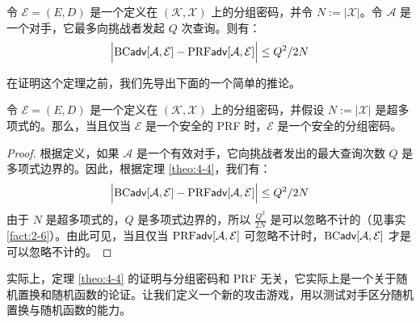 \begin{theorem}\label{theo:4-4}
令 $\mathcal{E}=(E,D)$ 是一个定义在 $(\mathcal{K},\mathcal{X})$ 上的分组密码，并令 $N:=|\mathcal{X}|$。令 $\mathcal{A}$ 是一个对手，它最多向挑战者发起 $Q$ 次查询。则有：
\[
\Big\lvert
{\rm BC\mathsf{adv}}[\mathcal{A},\mathcal{E}]-{\rm PRF\mathsf{adv}}[\mathcal{A},\mathcal{E}]
\Big\rvert
\leq{Q^2}/{2N}
\]
\end{theorem}

在证明这个定理之前，我们先导出下面的一个简单的推论。

\begin{corollary}\label{cor:4-5}
令 $\mathcal{E}=(E,D)$ 是一个定义在 $(\mathcal{K},\mathcal{X})$ 上的分组密码，并假设 $N:=|\mathcal{X}|$ 是超多项式的。那么，当且仅当 $\mathcal{E}$ 是一个安全的 PRF 时，$\mathcal{E}$ 是一个安全的分组密码。
\end{corollary}

\begin{proof}
根据定义，如果 $\mathcal{A}$ 是一个有效对手，它向挑战者发出的最大查询次数 $Q$ 是多项式边界的。因此，根据定理 \ref{theo:4-4}，我们有：
\[
\Big\lvert
{\rm BC\mathsf{adv}}[\mathcal{A},\mathcal{E}]-{\rm PRF\mathsf{adv}}[\mathcal{A},\mathcal{E}]
\Big\rvert
\leq{Q^2}/{2N}
\]
由于 $N$ 是超多项式的，$Q$ 是多项式边界的，所以 $\frac{Q^2}{2N}$ 是可以忽略不计的（见事实 \ref{fact:2-6}）。由此可见，当且仅当 ${\rm PRF\mathsf{adv}}[\mathcal{A},\mathcal{E}]$ 可忽略不计时，${\rm BC\mathsf{adv}}[\mathcal{A},\mathcal{E}]$ 才是可以忽略不计的。
\end{proof}

实际上，定理 \ref{theo:4-4} 的证明与分组密码和 PRF 无关，它实际上是一个关于随机置换和随机函数的论证。让我们定义一个新的攻击游戏，用以测试对手区分随机置换与随机函数的能力。

